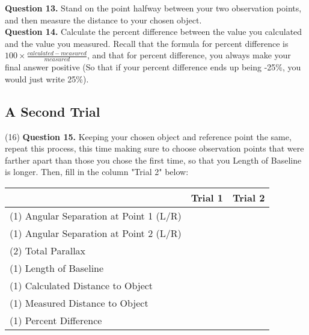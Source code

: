 \documentclass[11pt]{article}
\begin{document}
\textbf{Question 13.} Stand on the point halfway between your two observation points, and then measure the distance to your chosen object.\\

\textbf{Question 14.} Calculate the percent difference between the value you calculated and the value you measured. Recall that the formula for percent difference is $100\times\frac{calculated-measured}{measured}$, and that for percent difference, you always make your final answer positive (So that if your percent difference ends up being -25\%, you would just write 25\%).

\newpage

\subsection*{A Second Trial}

(16) \textbf{Question 15.} Keeping your chosen object and reference point the same, repeat this process, this time making sure to choose observation points that were farther apart than those you chose the first time, so that you Length of Baseline is longer. Then, fill in the column "Trial 2" below: \\

\begin{tabular}{| l | l | l |}
	\hline
	                               & Trial 1\hspace{4cm} & Trial 2\hspace{4cm}  \\ \hline
	(1) Angular Separation at Point 1 (L/R)  &                     &                      \\ \hline
	(1) Angular Separation at Point 2  (L/R) &                     &                      \\ \hline
	(2) Total Parallax                       &                     &                      \\ \hline
	(1) Length of Baseline                   &                     &                      \\ \hline
	(1) Calculated Distance to Object        &                     &                      \\ \hline
	(1) Measured Distance to Object          &                     &                      \\ \hline
	(1) Percent Difference                   &                     &                      \\
	\hline
\end{tabular}\\
\end{document}
